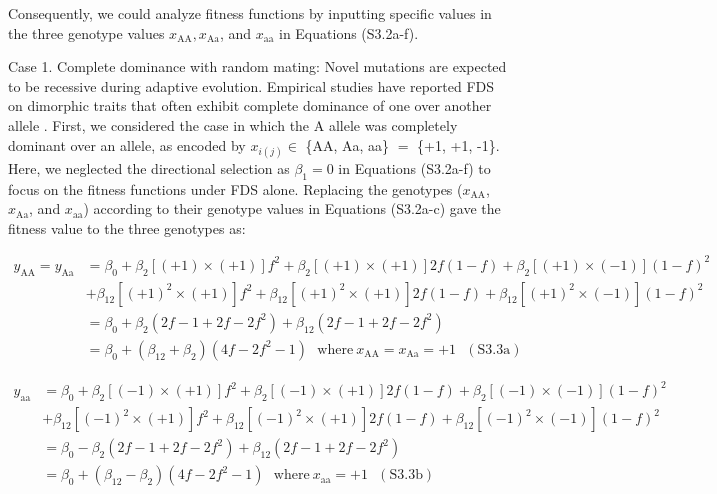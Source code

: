 \documentclass[12pt,]{article}
\begin{document}
\noindent
Consequently, we could analyze fitness functions by inputting specific values in the three genotype values $x_\mathrm{AA}, x_\mathrm{Aa}$, and $x_\mathrm{aa}$ in Equations (S3.2a-f).

Case 1. Complete dominance with random mating: Novel mutations are expected to be recessive during adaptive evolution. Empirical studies have reported FDS on dimorphic traits that often exhibit complete dominance of one over another allele \citep[for example,][]{takahashi2010negative,sato2017herbivore,goldberg2020herbivore}. First, we considered the case in which the A allele was completely dominant over an allele, as encoded by $x_{i(j)} \in$ \{AA, Aa, aa\} $=$ \{+1, +1, -1\}. Here, we neglected the directional selection as $\beta_1=0$ in Equations (S3.2a-f) to focus on the fitness functions under FDS alone. Replacing the genotypes ($x_\mathrm{AA}$, $x_\mathrm{Aa}$, and $x_\mathrm{aa}$) according to their genotype values in Equations (S3.2a-c) gave the fitness value to the three genotypes as:

\begin{equation*}
\begin{split}
y_\mathrm{AA} = y_\mathrm{Aa} &= \beta_0 + \beta_2 [(+1)\times(+1)] f^2 + \beta_2 [(+1)\times(+1)] 2f(1-f) + \beta_2 [(+1)\times(-1)] (1-f)^2 \\
& + \beta_{12} [(+1)^2\times(+1)] f^2 + \beta_{12} [(+1)^2\times(+1)] 2f(1-f) + \beta_{12} [(+1)^2\times(-1)] (1-f)^2 \\ 
&= \beta_0 + \beta_2(2f-1+2f-2f^2) + \beta_{12}(2f-1+2f-2f^2) \\
&= \beta_0 + (\beta_{12}+\beta_2)(4f-2f^2-1)~~~\mathrm{where}~x_\mathrm{AA}=x_\mathrm{Aa} = +1~~~(\mathrm{S3.3a})
\end{split}
\end{equation*}

\begin{equation*}
\begin{split}
y_\mathrm{aa} &= \beta_0 + \beta_2[(-1)\times(+1)]f^2 + \beta_2[(-1)\times(+1)]2f(1-f) + \beta_2[(-1)\times(-1)](1-f)^2 \\
& + \beta_{12}[(-1)^2\times(+1)]f^2 + \beta_{12}[(-1)^2\times(+1)]2f(1-f) + \beta_{12}[(-1)^2\times(-1)](1-f)^2 \\ 
&= \beta_0 - \beta_2(2f-1+2f-2f^2) + \beta_{12}(2f-1+2f-2f^2) \\
&= \beta_0 + (\beta_{12}-\beta_2)(4f-2f^2-1)~~~\mathrm{where}~x_\mathrm{aa} = +1~~~(\mathrm{S3.3b})
\end{split}
\end{equation*}
\end{document}
